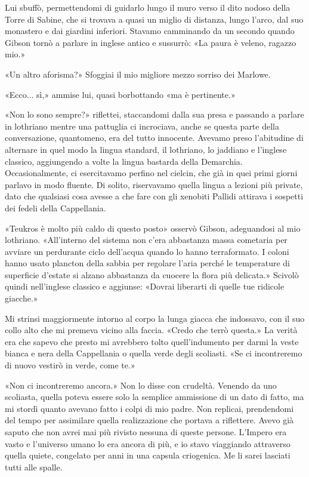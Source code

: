 Lui sbuffò, permettendomi di guidarlo lungo il muro verso il dito nodoso
della Torre di Sabine, che si trovava a quasi un miglio di distanza,
lungo l'arco, dal suo monastero e dai giardini inferiori. Stavamo
camminando da un secondo quando Gibson tornò a parlare in inglese antico
e sussurrò: «La paura è veleno, ragazzo mio.»

«Un altro aforisma?» Sfoggiai il mio migliore mezzo sorriso dei Marlowe.

«Ecco... sì,» ammise lui, quasi borbottando «ma è pertinente.»

«Non lo sono sempre?» riflettei, staccandomi dalla sua presa e passando
a parlare in lothriano mentre una pattuglia ci incrociava, anche se
questa parte della conversazione, quantomeno, era del tutto innocente.
Avevamo preso l'abitudine di alternare in quel modo la lingua standard,
il lothriano, lo jaddiano e l'inglese classico, aggiungendo a volte la
lingua bastarda della Demarchia. Occasionalmente, ci esercitavamo
perfino nel cielcin, che già in quei primi giorni parlavo in modo
fluente. Di solito, riservavamo quella lingua a lezioni più private,
dato che qualsiasi cosa avesse a che fare con gli xenobiti Pallidi
attirava i sospetti dei fedeli della Cappellania.

«Teukros è molto più caldo di questo posto» osservò Gibson, adeguandosi
al mio lothriano. «All'interno del sistema non c'era abbastanza massa
cometaria per avviare un perdurante ciclo dell'acqua quando lo hanno
terraformato. I coloni hanno usato plancton della sabbia per regolare
l'aria perché le temperature di superficie d'estate si alzano abbastanza
da cuocere la flora più delicata.» Scivolò quindi nell'inglese classico
e aggiunse: «Dovrai liberarti di quelle tue ridicole giacche.»

Mi strinsi maggiormente intorno al corpo la lunga giacca che indossavo,
con il suo collo alto che mi premeva vicino alla faccia. «Credo che
terrò questa.» La verità era che sapevo che presto mi avrebbero tolto
quell'indumento per darmi la veste bianca e nera della Cappellania o
quella verde degli scoliasti. «Se ci incontreremo di nuovo vestirò in
verde, come te.»

«Non ci incontreremo ancora.» Non lo disse con crudeltà. Venendo da uno
scoliasta, quella poteva essere solo la semplice ammissione di un dato
di fatto, ma mi stordì quanto avevano fatto i colpi di mio padre. Non
replicai, prendendomi del tempo per assimilare quella realizzazione che
portava a riflettere. Avevo già saputo che non avrei mai più rivisto
nessuna di queste persone. L'Impero era vasto e l'universo umano lo era
ancora di più, e io stavo viaggiando attraverso quella quiete, congelato
per anni in una capsula criogenica. Me li sarei lasciati tutti alle
spalle.


